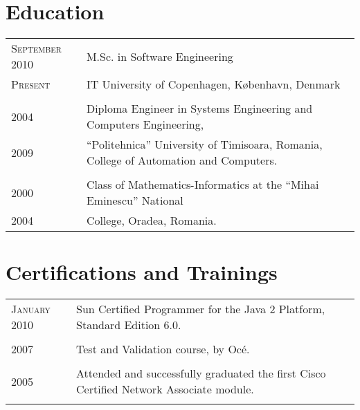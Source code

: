 \documentclass[a4paper,10pt]{article}
\begin{document}
\section{Education}
\begin{tabular}{p{2.5cm}|p{11cm}}
\raggedleft \textsc{September 2010} & M.Sc. in Software Engineering \\
\raggedleft \textsc{Present} & IT University of Copenhagen, København,
Denmark \\ \multicolumn{2}{c}{} \\
\raggedleft \textsc{2004} & Diploma Engineer in Systems Engineering and
Computers Engineering, \\ \raggedleft \textsc{2009} & ``Politehnica'' University of Timisoara, Romania, College of Automation and
Computers.
\\\multicolumn{2}{c}{} \\ \raggedleft \textsc{2000} & Class of Mathematics-Informatics at the
``Mihai Eminescu'' National \\ \raggedleft \textsc{2004} &
College, Oradea, Romania.\\
\end{tabular}

\section{Certifications and Trainings}
\begin{tabular}{p{2.5cm}|p{11cm}}
\raggedleft \textsc{January 2010} & Sun Certified Programmer for the Java 2
Platform, Standard Edition 6.0. 
\\
\multicolumn{2}{c}{}
\\
 \raggedleft \textsc{2007} & Test and Validation course, by Oc\'e.\\
\multicolumn{2}{c}{} 
\\ 
\raggedleft  \textsc{2005} & Attended and successfully
graduated the first Cisco Certified Network Associate module.\\ \multicolumn{2}{c}{} \\
\end{tabular}

\end{document}
